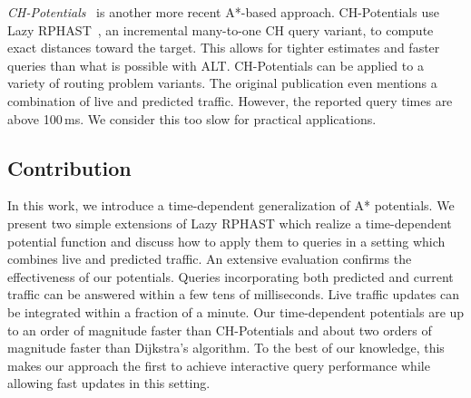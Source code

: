 \documentclass[a4paper,UKenglish,cleveref, autoref, thm-restate,anonymous]{lipics-v2021}
\begin{document}
\emph{CH-Potentials}~\cite{strasser_et_al:LIPIcs.SEA.2021.6} is another more recent A*-based approach.
CH-Potentials use Lazy RPHAST~\cite{strasser_et_al:LIPIcs.SEA.2021.6}, an incremental many-to-one CH query variant, to compute exact distances toward the target.
This allows for tighter estimates and faster queries than what is possible with ALT.
CH-Potentials can be applied to a variety of routing problem variants.
The original publication even mentions a combination of live and predicted traffic.
However, the reported query times are above 100\,ms.
We consider this too slow for practical applications.

\subsection{Contribution}

In this work, we introduce a time-dependent generalization of A* potentials.
We present two simple extensions of Lazy RPHAST which realize a time-dependent potential function and discuss how to apply them to queries in a setting which combines live and predicted traffic.
An extensive evaluation confirms the effectiveness of our potentials.
Queries incorporating both predicted and current traffic can be answered within a few tens of milliseconds.
Live traffic updates can be integrated within a fraction of a minute.
Our time-dependent potentials are up to an order of magnitude faster than CH-Potentials and about two orders of magnitude faster than Dijkstra's algorithm.
To the best of our knowledge, this makes our approach the first to achieve interactive query performance while allowing fast updates in this setting.
\end{document}
